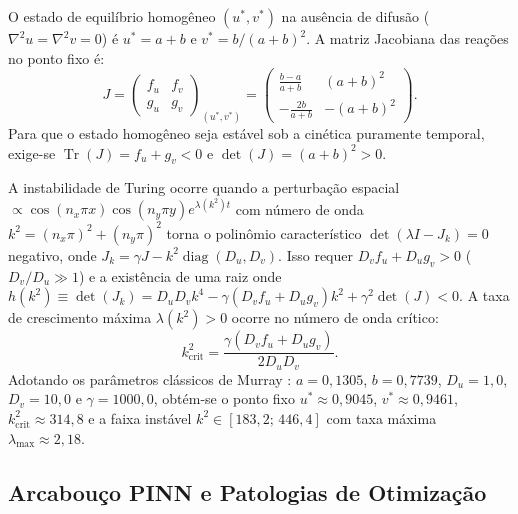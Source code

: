 \documentclass[a4paper, 12pt, twoside]{article}
\begin{document}
O estado de equilíbrio homogêneo $(u^*, v^*)$ na ausência de difusão ($\nabla^2 u = \nabla^2 v = 0$)
é $u^* = a + b$ e $v^* = b/(a + b)^2$. A matriz Jacobiana das reações no ponto fixo é:
\begin{equation}
  J = \begin{pmatrix} f_u & f_v \\ g_u & g_v \end{pmatrix}_{(u^*, v^*)} =
  \begin{pmatrix} \frac{b - a}{a + b} & (a + b)^2 \\ -\frac{2b}{a + b} & -(a + b)^2 \end{pmatrix}.
  \label{eq:jacobiano}
\end{equation}
Para que o estado homogêneo seja estável sob a cinética puramente temporal, exige-se
$\operatorname{Tr}(J) = f_u + g_v < 0$ e $\det(J) = (a + b)^2 > 0$.

A instabilidade de Turing ocorre quando a perturbação espacial $\propto \cos(n_x \pi x)\cos(n_y \pi y) e^{\lambda(k^2) t}$
com número de onda $k^2 = (n_x \pi)^2 + (n_y \pi)^2$ torna o polinômio característico
$\det(\lambda I - J_k) = 0$ negativo, onde $J_k = \gamma J - k^2 \operatorname{diag}(D_u, D_v)$.
Isso requer $D_v f_u + D_u g_v > 0$ ($D_v/D_u \gg 1$) e a existência de uma raiz onde
$h(k^2) \equiv \det(J_k) = D_u D_v k^4 - \gamma (D_v f_u + D_u g_v) k^2 + \gamma^2 \det(J) < 0$.
A taxa de crescimento máxima $\lambda(k^2) > 0$ ocorre no número de onda crítico:
\begin{equation}
  k_{\mathrm{crit}}^2 = \frac{\gamma(D_v f_u + D_u g_v)}{2 D_u D_v}.
  \label{eq:kcrit}
\end{equation}
Adotando os parâmetros clássicos de Murray \cite{murray2003, pereira2019}: $a = 0{,}1305$,
$b = 0{,}7739$, $D_u = 1{,}0$, $D_v = 10{,}0$ e $\gamma = 1000{,}0$, obtém-se o ponto fixo
$u^* \approx 0{,}9045$, $v^* \approx 0{,}9461$, $k_{\mathrm{crit}}^2 \approx 314{,}8$ e a
faixa instável $k^2 \in [183{,}2;\, 446{,}4]$ com taxa máxima $\lambda_{\max} \approx 2{,}18$.

\subsection{Arcabouço PINN e Patologias de Otimização}
\end{document}
